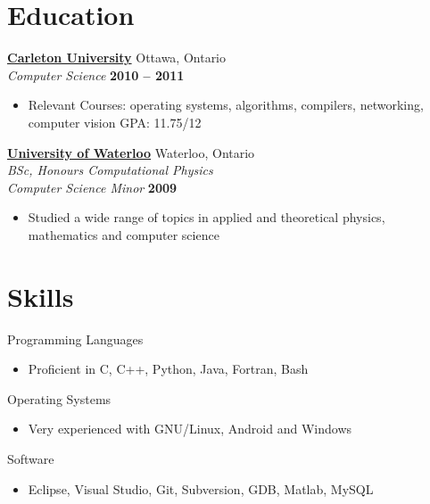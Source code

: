 \documentclass[margin,line]{res}
\begin{document}
\begin{resume}
    
    


  \section{\sc Education}

      \href{http://www.carleton.ca}{\bf Carleton University} {\hfill Ottawa, Ontario}\\
      {\em Computer Science} \hfill {\bf 2010 -- 2011}
      \begin{itemize} \itemsep -2pt
        \item Relevant Courses: operating systems, algorithms, compilers, networking, computer vision GPA: 11.75/12
      \end{itemize}


      \href{http://www.uwaterloo.ca}{\bf University of Waterloo} {\hfill Waterloo, Ontario}\\
      {\em BSc, Honours Computational Physics \\ Computer Science Minor} \hfill {\bf 2009}
      \begin{itemize} \itemsep -2pt
        \item Studied a wide range of topics in applied and theoretical physics, mathematics and computer science
      \end{itemize}




    \section{\sc Skills} 

      {Programming Languages}
      \begin{itemize} \itemsep -2pt
        \item Proficient in C, C++, Python, Java, Fortran, Bash
      \end{itemize}
      
      \vspace{-.3cm}
      
      {Operating Systems}
      \begin{itemize} \itemsep -2pt
        \item Very experienced with GNU/Linux, Android and Windows
      \end{itemize}
      
      \vspace{-.3cm}

      {Software}
      \begin{itemize} \itemsep -2pt
        \item Eclipse, Visual Studio, Git, Subversion, GDB, Matlab, MySQL
      \end{itemize}




\end{resume}
\end{document}
